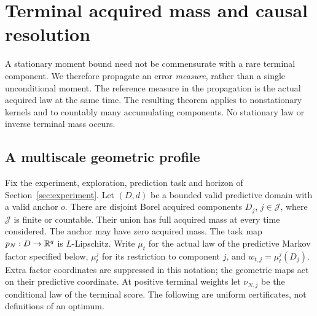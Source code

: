 \section{Terminal acquired mass and causal resolution}\label{sec:bridge}
A stationary moment bound need not be commensurate with a rare terminal component. We therefore propagate an error \emph{measure}, rather than a single unconditional moment. The reference measure in the propagation is the actual acquired law at the same time. The resulting theorem applies to nonstationary kernels and to countably many accumulating components. No stationary law or inverse terminal mass occurs.

\subsection{A multiscale geometric profile}
Fix the experiment, exploration, prediction task and horizon of Section~\ref{sec:experiment}. Let $(D,d)$ be a bounded valid predictive domain with a valid anchor $o$. There are disjoint Borel acquired components $D_j$, $j\in\mathcal J$, where $\mathcal J$ is finite or countable. Their union has full acquired mass at every time considered. The anchor may have zero acquired mass. The task map $p_N:D\to\mathbb R^q$ is $L$-Lipschitz. Write $\mu_t$ for the actual law of the predictive Markov factor specified below, $\mu_t^j$ for its restriction to component $j$, and $w_{t,j}=\mu_t^j(D_j)$. Extra factor coordinates are suppressed in this notation; the geometric maps act on their predictive coordinate. At positive terminal weights let $\nu_{N,j}$ be the conditional law of the terminal score. The following are uniform certificates, not definitions of an optimum.

